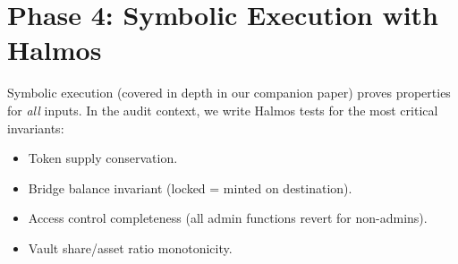 \section{Phase 4: Symbolic Execution with Halmos}


Symbolic execution (covered in depth in our companion paper) proves properties for
\emph{all} inputs. In the audit context, we write Halmos tests for the most critical
invariants:

\begin{itemize}[nosep]
  \item Token supply conservation.
  \item Bridge balance invariant (locked = minted on destination).
  \item Access control completeness (all admin functions revert for non-admins).
  \item Vault share/asset ratio monotonicity.
\end{itemize}

